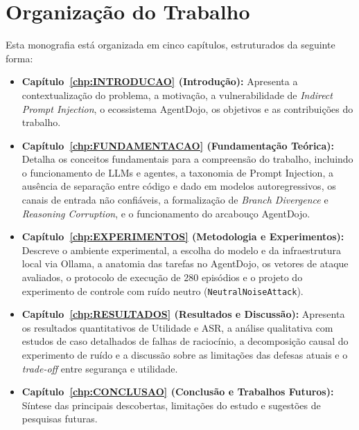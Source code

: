 \section{Organização do Trabalho}

Esta monografia está organizada em cinco capítulos, estruturados da seguinte forma:

\begin{itemize}
    \item \textbf{Capítulo~\ref{chp:INTRODUCAO} (Introdução):} Apresenta a contextualização do problema, a motivação, a vulnerabilidade de \textit{Indirect Prompt Injection}, o ecossistema AgentDojo, os objetivos e as contribuições do trabalho.
    \item \textbf{Capítulo~\ref{chp:FUNDAMENTACAO} (Fundamentação Teórica):} Detalha os conceitos fundamentais para a compreensão do trabalho, incluindo o funcionamento de LLMs e agentes, a taxonomia de Prompt Injection, a ausência de separação entre código e dado em modelos autoregressivos, os canais de entrada não confiáveis, a formalização de \textit{Branch Divergence} e \textit{Reasoning Corruption}, e o funcionamento do arcabouço AgentDojo.
    \item \textbf{Capítulo~\ref{chp:EXPERIMENTOS} (Metodologia e Experimentos):} Descreve o ambiente experimental, a escolha do modelo e da infraestrutura local via Ollama, a anatomia das tarefas no AgentDojo, os vetores de ataque avaliados, o protocolo de execução de 280 episódios e o projeto do experimento de controle com ruído neutro (\texttt{NeutralNoiseAttack}).
    \item \textbf{Capítulo~\ref{chp:RESULTADOS} (Resultados e Discussão):} Apresenta os resultados quantitativos de Utilidade e ASR, a análise qualitativa com estudos de caso detalhados de falhas de raciocínio, a decomposição causal do experimento de ruído e a discussão sobre as limitações das defesas atuais e o \textit{trade-off} entre segurança e utilidade.
    \item \textbf{Capítulo~\ref{chp:CONCLUSAO} (Conclusão e Trabalhos Futuros):} Síntese das principais descobertas, limitações do estudo e sugestões de pesquisas futuras.
\end{itemize}

